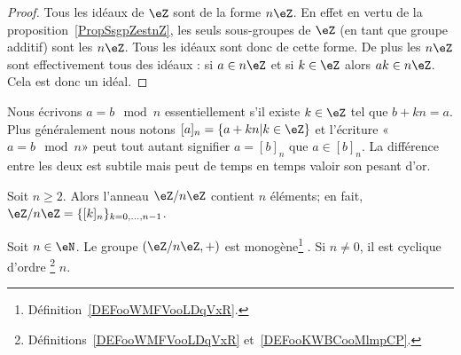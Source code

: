 \begin{proof}
    Tous les idéaux de \( \eZ\) sont de la forme \( n\eZ\). En effet en vertu de la proposition~\ref{PropSsgpZestnZ}, les seuls sous-groupes de \( \eZ\) (en tant que groupe additif) sont les \( n\eZ\). Tous les idéaux sont donc de cette forme. De plus les \( n\eZ\) sont effectivement tous des idéaux : si \( a\in n\eZ\) et si \( k\in \eZ\) alors \( ak\in n\eZ\). Cela est donc un idéal.
\end{proof}


Nous écrivons \( a=b\mod n\) essentiellement s'il existe \( k\in \eZ\) tel que \( b+kn=a\). Plus généralement nous notons \( [a]_n=\{ a+kn | k\in \eZ \}\) et l'écriture «\( a=b\mod n\)» peut tout autant signifier \( a=[b]_n\) que \( a\in [b]_n\). La différence entre les deux est subtile mais peut de temps en temps valoir son pesant d'or.


\begin{corollary}   \label{PROPooEWREooUOSMsE}
    Soit \( n\geq 2\). Alors l'anneau \( \eZ/n\eZ\) contient \( n\) éléments; en fait, \( \eZ/n\eZ=\{ [k]_n \}_{k=0,\ldots, n-1}\).
\end{corollary}

\begin{proposition}
    Soit \( n\in\eN\). Le groupe \( (\eZ/n\eZ, +)\) est monogène\footnote{Définition~\ref{DEFooWMFVooLDqVxR}.} . Si \( n\neq 0\), il est cyclique  d'ordre \footnote{Définitions~\ref{DEFooWMFVooLDqVxR} et~\ref{DEFooKWBCooMlmpCP}.} \( n\).
\end{proposition}

